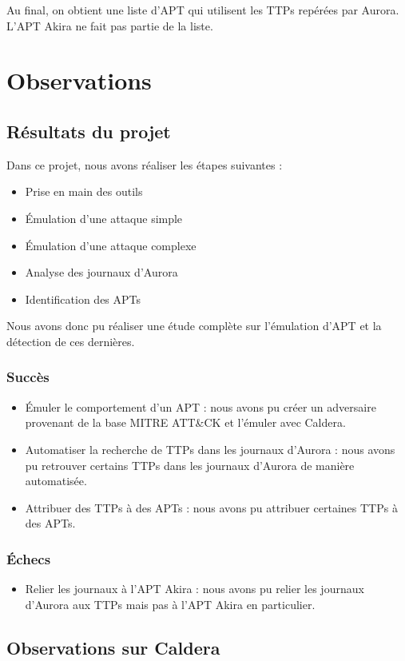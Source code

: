 \documentclass[12pt,letterpaper]{article}
\begin{document}
Au final, on obtient une liste d'APT qui utilisent les TTPs repérées par Aurora.
L'APT Akira ne fait pas partie de la liste.

\section{Observations}
\subsection{Résultats du projet}
Dans ce projet, nous avons réaliser les étapes suivantes :
\begin{itemize}
    \item Prise en main des outils
    \item Émulation d'une attaque simple
    \item Émulation d'une attaque complexe
    \item Analyse des journaux d'Aurora
    \item Identification des APTs
\end{itemize}
Nous avons donc pu réaliser une étude complète sur l'émulation d'APT et la détection de ces dernières.

\subsubsection{Succès}
\begin{itemize}
    \item Émuler le comportement d'un APT : nous avons pu créer un adversaire provenant de la base MITRE ATT\&CK et l'émuler avec Caldera.
    \item Automatiser la recherche de TTPs dans les journaux d'Aurora : nous avons pu retrouver certains TTPs dans les journaux d'Aurora de manière automatisée.
    \item Attribuer des TTPs à des APTs : nous avons pu attribuer certaines TTPs à des APTs.
\end{itemize}
\subsubsection{Échecs}
\begin{itemize}
    \item Relier les journaux à l'APT Akira : nous avons pu relier les journaux d'Aurora aux TTPs mais pas à l'APT Akira en particulier.
\end{itemize}

\subsection{Observations sur Caldera}
\end{document}
